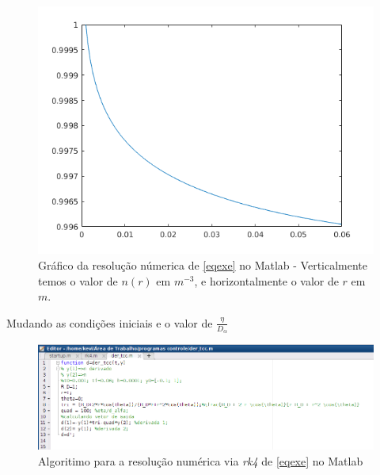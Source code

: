 \documentclass[12pt,oneside,a4paper]{abntex2}
\begin{document}
\begin{figure}[H]
\centering
\includegraphics[scale=0.5]{exemplo1.png} 
\caption{Gráfico da resolução númerica de \ref{eqexe} no Matlab - Verticalmente temos o valor de $n(r)$ em $m^{-3}$, e horizontalmente o valor de $r$ em $m$.}
\end{figure}

Mudando as condições iniciais e o valor de $\frac{\eta}{D_\alpha}$ 

\begin{figure}[H]
\centering
\includegraphics[scale=0.4]{exemplo2.png} 
\caption{Algoritimo para a resolução numérica via \textit{rk4} de \ref{eqexe} no Matlab}
\end{figure}
\end{document}
